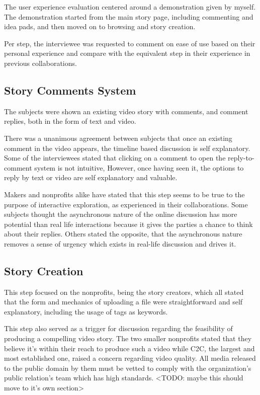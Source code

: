 The user experience evaluation centered around a demonstration given by myself. The demonstration started from the main story page, including commenting and idea pads, and then moved on to browsing and story creation. 

Per step, the interviewee was requested to comment on ease of use based on their personal experience and compare with the equivalent step in their experience in previous collaborations. 

\subsection{Story Comments System}

The subjects were shown an existing video story with comments, and comment replies, both in the form of text and video.

There was a unanimous agreement between subjects that once an existing comment in the video appears, the timeline based discussion is self explanatory. Some of the interviewees stated that clicking on a comment to open the reply-to-comment system is not intuitive, However, once having seen it, the options to reply by text or video are self explanatory and valuable.

Makers and nonprofits alike have stated that this step seems to be true to the purpose of interactive exploration, as experienced in their collaborations. Some subjects thought the asynchronous nature of the online discussion has more potential than real life interactions because it gives the parties a chance to think about their replies. Others stated the opposite, that the asynchronous nature removes a sense of urgency which exists in real-life discussion and drives it. 

\subsection{Story Creation}

This step focused on the nonprofits, being the story creators, which all stated that the form and mechanics of uploading a file were straightforward and self explanatory, including the usage of tags as keywords. 

This step also served as a trigger for discussion regarding the feasibility of producing a compelling video story. The two smaller nonprofits stated that they believe it's within their reach to produce such a video while C2C, the largest and most established one, raised a concern regarding video quality. All media released to the public domain by them must be vetted to comply with the organization's public relation's team which has high standards. 
<TODO: maybe this should move to it's own section>  

